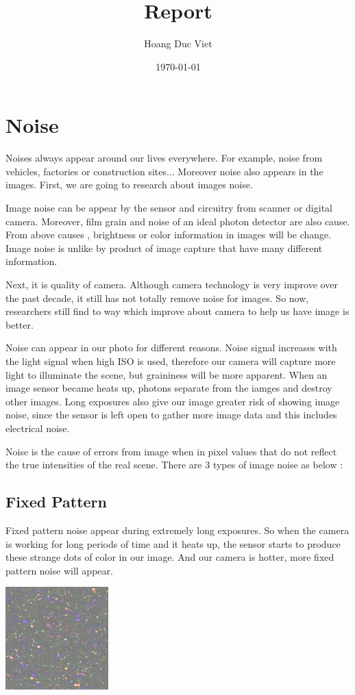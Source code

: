 \documentclass[10pt]{article}
\begin{document}
		\title{Report}
		\author{Hoang Duc Viet}
		\date{\today}
		\maketitle

\newpage
\newpage
\section{Noise}
Noises always appear around our lives everywhere. For example, noise from vehicles, factories or construction sites... Moreover noise also appears in the images. First, we are going to research about images noise.

Image noise can be appear by the sensor and circuitry from scanner or digital camera. Moreover, film grain and noise of an ideal photon detector are also cause. From above causes , brightness or color information in images will be change. Image noise is unlike by product of image capture that have many different information.

Next, it is quality of camera. Although camera technology is very improve over the past decade, it still has not totally remove noise for images. So now, researchers still find to way which improve about camera to help us have image is better.   


Noise can appear in our photo for different reasons. Noise signal increases with the light signal when high ISO is used, therefore our camera will capture more light to illuminate the scene, but graininess will be more apparent. When an image sensor became heats up, photons separate from the iamges and destroy other images. Long exposures also give our image greater risk of showing image noise, since the sensor is left open to gather more image data and this includes electrical noise.

Noise is the cause of errors from image when in pixel values that do not reflect the true intensities of the real scene. There are 3 types of image noise as below :

\subsection{Fixed Pattern}
Fixed pattern noise appear during extremely long exposures. So when the camera is working for long periods of time and it heats up, the sensor starts to produce these strange dots of color in our image. And our camera is hotter, more fixed pattern noise will appear.
\begin{center}
	\includegraphics{fix.png}
\end{center}
\end{document}
